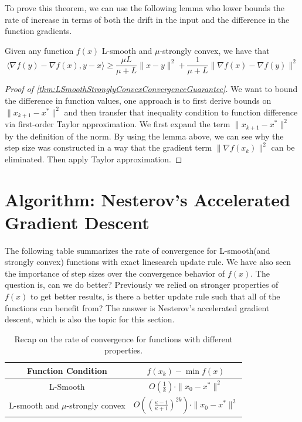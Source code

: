 To prove this theorem, we can use the following lemma who lower bounds the rate of increase in terms of both the drift in the input and the difference in the function gradients.
\begin{lemma}
    Given any function $f(x)$ L-smooth and $\mu$-strongly convex, we have that
    \begin{equation*}
        \langle \nabla f(y) - \nabla f(x), y-x \rangle \geq \frac{\mu L}{\mu + L}\| x-y \|^2 + \frac{1}{\mu + L} \| \nabla f(x) - \nabla f(y) \|^2
    \end{equation*}
\end{lemma}

\begin{proof}[Proof of \ref{thm:LSmoothStronglyConvexConvergenceGuarantee}]
    We want to bound the difference in function values, one approach is to first derive bounds on $\|x_{k+1} - x^* \|^2$ and then transfer that inequality condition to function difference via first-order Taylor approximation. We first expand the term $\| x_{k+1} - x^* \|^2$ by the definition of the norm. By using the lemma above, we can see why the step size was constructed in a way that the gradient term $\| \nabla f(x_k) \|^2$ can be eliminated. Then apply Taylor approximation. 
\end{proof}


\section{Algorithm: Nesterov's Accelerated Gradient Descent}
The following table summarizes the rate of convergence for L-smooth(and strongly convex) functions with exact linesearch update rule. We have also seen the importance of step sizes over the convergence behavior of $f(x)$. The question is, can we do better? Previously we relied on stronger properties of $f(x)$ to get better results, is there a better update rule such that all of the functions can benefit from? The answer is Nesterov's accelerated gradient descent, which is also the topic for this section.
\begin{table}[H]
    \centering
    \begin{tabular}{c|c}
        \rule{0pt}{4ex} Function Condition & $f(x_k) - \min f(x)$ \\
        \hline
        \rule{0pt}{4ex} L-Smooth & $O\left(\frac{1}{k}\right) \cdot \|x_0 - x^*\|^2$ \\
        \rule{0pt}{4ex} L-smooth and $\mu$-strongly convex & $O\left(\left(\frac{\kappa - 1}{\kappa + 1}\right)^{2k}\right) \cdot \|x_0 - x^*\|^2$ \\
    \end{tabular}
    \caption{Recap on the rate of convergence for functions with different properties.}
\end{table}


